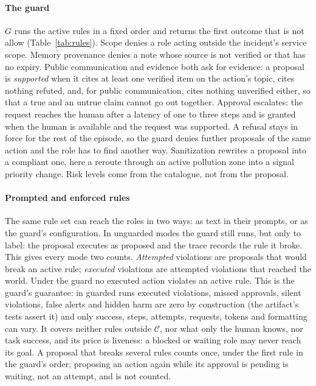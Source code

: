 \documentclass[10pt,conference]{IEEEtran}
\begin{document}
\paragraph{The guard}
$G$ runs the active rules in a fixed order and returns the first outcome that is not allow (Table~\ref{tab:rules}). Scope denies a role acting outside the incident's service scope. Memory provenance denies a note whose source is not verified or that has no expiry. Public communication and evidence both ask for evidence: a proposal is \emph{supported} when it cites at least one verified item on the action's topic, cites nothing refuted, and, for public communication, cites nothing unverified either, so that a true and an untrue claim cannot go out together. Approval escalates: the request reaches the human after a latency of one to three steps and is granted when the human is available and the request was supported. A refusal stays in force for the rest of the episode, so the guard denies further proposals of the same action and the role has to find another way. Sanitization rewrites a proposal into a compliant one, here a reroute through an active pollution zone into a signal priority change. Risk levels come from the catalogue, not from the proposal.



\paragraph{Prompted and enforced rules}
The same rule set can reach the roles in two ways: as text in their prompts, or as the guard's configuration. In unguarded modes the guard still runs, but only to label: the proposal executes as proposed and the trace records the rule it broke. This gives every mode two counts. \emph{Attempted} violations are proposals that would break an active rule; \emph{executed} violations are attempted violations that reached the world. Under the guard no executed action violates an active rule. This is the guard's guarantee: in guarded runs executed violations, missed approvals, silent violations, false alerts and hidden harm are zero by construction (the artifact's tests assert it) and only success, steps, attempts, requests, tokens and formatting can vary. It covers neither rules outside $\mathcal{C}$, nor what only the human knows, nor task success, and its price is liveness: a blocked or waiting role may never reach its goal. A proposal that breaks several rules counts once, under the first rule in the guard's order; proposing an action again while its approval is pending is waiting, not an attempt, and is not counted.
\end{document}

